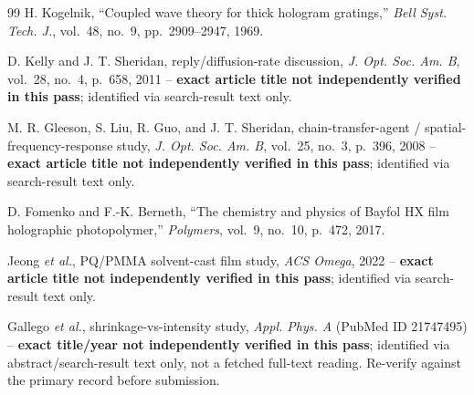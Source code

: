 \documentclass[conference]{IEEEtran}
\begin{document}
\begin{thebibliography}{99}
H. Kogelnik, ``Coupled wave theory for thick hologram gratings,'' \textit{Bell
Syst. Tech. J.}, vol.~48, no.~9, pp.~2909--2947, 1969.

D. Kelly and J. T. Sheridan, reply/diffusion-rate discussion, \textit{J. Opt.
Soc. Am. B}, vol.~28, no.~4, p.~658, 2011 -- \textbf{exact article title not
independently verified in this pass}; identified via search-result text only.

M. R. Gleeson, S. Liu, R. Guo, and J. T. Sheridan, chain-transfer-agent /
spatial-frequency-response study, \textit{J. Opt. Soc. Am. B}, vol.~25, no.~3,
p.~396, 2008 -- \textbf{exact article title not independently verified in
this pass}; identified via search-result text only.

D. Fomenko and F.-K. Berneth, ``The chemistry and physics of Bayfol HX film
holographic photopolymer,'' \textit{Polymers}, vol.~9, no.~10, p.~472, 2017.

Jeong \emph{et al.}, PQ/PMMA solvent-cast film study, \textit{ACS Omega},
2022 -- \textbf{exact article title not independently verified in this
pass}; identified via search-result text only.

Gallego \emph{et al.}, shrinkage-vs-intensity study, \textit{Appl. Phys. A}
(PubMed ID 21747495) -- \textbf{exact title/year not independently verified
in this pass}; identified via abstract/search-result text only, not a fetched
full-text reading. Re-verify against the primary record before submission.

\end{thebibliography}
\end{document}
